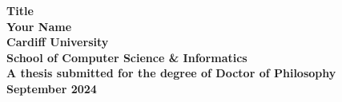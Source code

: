 \documentclass[a4paper,oneside,onecolumn,openright,12pt]{book} %
\begin{document}
\frontmatter

\begin{titlepage}

\begin{center}
\vspace*{3ex}
\textbf{\Huge Title}\\
\vfill
\textbf{\LARGE Your Name}\\[2ex]
\textbf{\large Cardiff University}\\
\textbf{\large School of Computer Science \& Informatics}\\
\vfill
\textbf{\large A thesis submitted for the degree of Doctor of Philosophy}\\[1ex]
\textbf{\large September 2024}\\
\end{center}

\end{titlepage}

\cleardoublepage



\def\baselinestretch{1.5}\normalfont

\tableofcontents

\listoffigures
\listoftables
\listofalgorithms


\cleardoublepage

\cleardoublepage

\cleardoublepage

\mainmatter



\backmatter

\def\baselinestretch{1}\normalfont
\def\baselinestretch{1.24}\normalfont



\appendix
\renewcommand{\thesection}{\Alph{section}}

\renewcommand\thefigure{\thesection\arabic{figure}}
\renewcommand\thetable{\thesection\arabic{table}}


\end{document}

